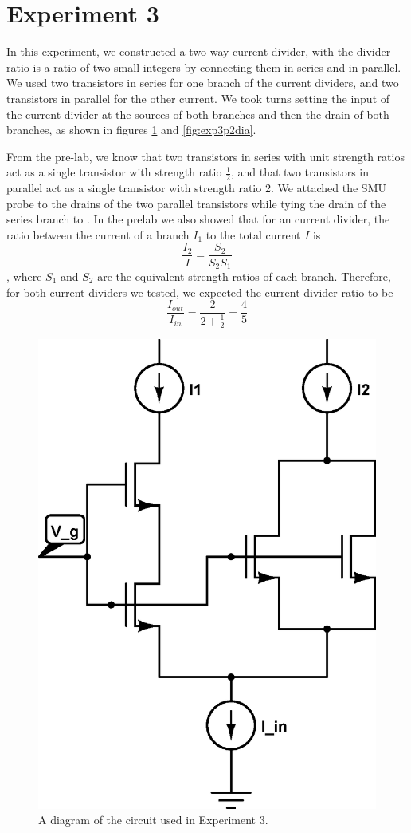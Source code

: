 \section*{Experiment 3}

In this experiment, we constructed a two-way current divider, with the divider ratio is a ratio of
two small integers by connecting them in series and in parallel. We used two \nMOS transistors in series for one branch of the current dividers, and two \nMOS transistors in parallel for the other current. We took turns setting the input of the current divider at the sources of both branches and then the drain of both branches, as shown in figures \ref{fig:exp3p1dia} and \ref{fig:exp3p2dia}.

From the pre-lab, we know that two transistors in series with unit strength ratios act as a single \nMOS transistor with strength ratio $\frac{1}{2}$, and that two \nMOS transistors in parallel act as a single \nMOS transistor with strength ratio 2. We attached the SMU probe to the drains of the two parallel \nMOS transistors while tying the drain of the series \nMOS branch to \Vdd. In the prelab we also showed that for an \nMOS current divider, the ratio between the current of a branch $I_1$ to the total current $I$ is $$\frac{I_2}{I} = \frac{S_2}{S_2S_1}$$, where $S_1$ and $S_2$ are the equivalent strength ratios of each branch. Therefore, for both current dividers we tested, we expected the current divider ratio to be $$\frac{I_{out}}{I_{in}} = \frac{2}{2 + \frac{1}{2}} = \frac{4}{5}$$


\begin{figure}[H]
\centering
\includegraphics[width=0.65\linewidth]{../Figures/Experiment3CircuitDiagram1.eps}
\caption{A diagram of the circuit used in Experiment 3.}
\label{fig:exp3p1dia}
\end{figure}


